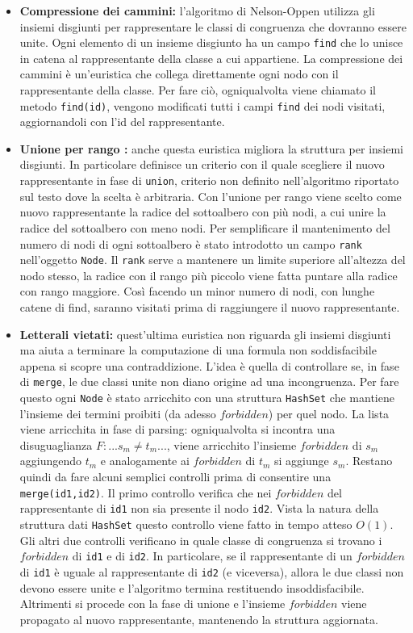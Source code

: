 \documentclass[a4paper,11pt]{article}
\begin{document}
\begin{itemize}
	\item {\bf Compressione dei cammini\cite{cormen}:} l'algoritmo di Nelson-Oppen utilizza gli insiemi disgiunti per rappresentare le classi di congruenza che dovranno essere unite. Ogni elemento di un insieme disgiunto ha un campo {\tt find} che lo unisce in catena al rappresentante della classe a cui appartiene.
La compressione dei cammini è un'euristica che collega direttamente ogni nodo con il rappresentante della classe.
Per fare ciò, ogniqualvolta viene chiamato il metodo {\tt find(id)}, vengono modificati tutti i campi {\tt find} dei nodi visitati, aggiornandoli con l'id del rappresentante.
	\item {\bf Unione per rango \cite{cormen}:} anche questa euristica migliora la struttura per insiemi disgiunti.
In particolare definisce un criterio con il quale scegliere il nuovo rappresentante in fase di {\tt union}, criterio non definito nell'algoritmo riportato sul testo dove la scelta è arbitraria.
Con l'unione per rango viene scelto come nuovo rappresentante la radice del sottoalbero con più nodi, a cui unire la radice del sottoalbero con meno nodi. Per semplificare il mantenimento del numero di nodi di ogni sottoalbero è stato introdotto un campo {\tt rank} nell'oggetto {\tt Node}.
Il {\tt rank} serve a mantenere un limite superiore all'altezza del nodo stesso, la radice con il rango più piccolo viene fatta puntare alla radice con rango maggiore.
Così facendo un minor numero di nodi, con lunghe catene di find, saranno visitati prima di raggiungere il nuovo rappresentante. 
	\item {\bf Letterali vietati:} quest'ultima euristica non riguarda gli insiemi disgiunti ma aiuta a terminare la computazione di una formula non soddisfacibile appena si scopre una contraddizione.
L'idea è quella di controllare se, in fase di {\tt merge}, le due classi unite non diano origine ad una incongruenza.
Per fare questo ogni {\tt Node} è stato arricchito con una struttura {\tt HashSet} che mantiene l'insieme dei termini proibiti (da adesso $forbidden$) per quel nodo.
La lista viene arricchita in fase di parsing: ogniqualvolta si incontra una disuguaglianza
$F: ... s_{m} \not= t_{m} ... $, viene arricchito l'insieme $forbidden$ di $s_{m}$ aggiungendo $t_{m}$ e analogamente ai $forbidden$ di $t_{m}$ si aggiunge $s_{m}$.
Restano quindi da fare alcuni semplici controlli prima di consentire una {\tt merge(id1,id2)}.
Il primo controllo verifica che nei $forbidden$ del rappresentante di {\tt id1} non sia presente il nodo {\tt id2}.
Vista la natura della struttura dati {\tt HashSet} questo controllo viene fatto in tempo atteso $O(1)$.
Gli altri due controlli verificano in quale classe di congruenza si trovano i $forbidden$ di {\tt id1} e di {\tt id2}.
In particolare, se il rappresentante di un $forbidden$ di {\tt id1} è uguale al rappresentante di {\tt id2} (e viceversa), allora le due classi non devono essere unite e l'algoritmo termina restituendo insoddisfacibile.
Altrimenti si procede con la fase di unione e l'insieme $forbidden$ viene propagato al nuovo rappresentante, mantenendo la struttura aggiornata.
\end{itemize}
\end{document}
